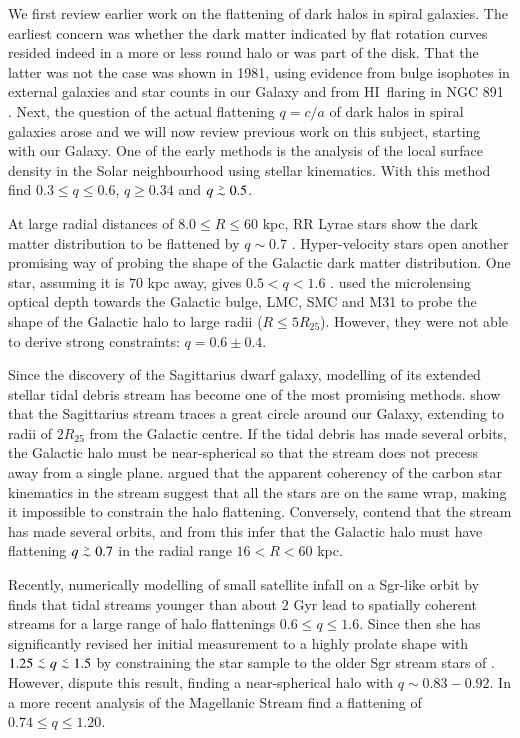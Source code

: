 \documentclass[traditabstract]{aa} %
\newcommand\lesim{\lower.5ex\hbox{$\; \buildrel < \over \sim \;$}}
\newcommand\gesim{\lower.5ex\hbox{$\; \buildrel > \over \sim \;$}}
\newcommand\HI{H{\small I}}
\begin{document}
We first review earlier work on the flattening of dark
halos in spiral galaxies. The earliest concern was whether 
the dark matter indicated by flat rotation curves resided indeed in 
a more or less round halo or was part of the disk. 
That the latter was not the case was
shown in 1981, using evidence from bulge isophotes in external
galaxies and star counts in our Galaxy \citep{mrs81} and from \HI\ flaring
in NGC 891 \citep{vdkruit1981}. Next, the question of the actual
flattening $q = c/a$ of dark
halos in spiral galaxies arose and we will now review previous work on this
subject, starting with our Galaxy.  One of the
early methods is the analysis of the local surface density in the
Solar neighbourhood using stellar kinematics. 
With this method \citet{bmo1987} find $0.3 \leq q \leq
0.6$, \citet{vdmarel1991} $q \geq 0.34$ and  \citet{bsmks2005} $q
\gesim 0.5$.


At large radial distances of $8.0 \leq R \leq 60$ kpc, RR Lyrae stars
show the dark matter distribution to be flattened by $q \sim 0.7$
\citep{ac1994}. Hyper-velocity stars open another promising way of
probing the shape of the Galactic dark matter distribution. One star,
assuming it is $70$ kpc away, gives $0.5 < q < 1.6$  \citep{ggmez2005}. 
\citet{scmz1999} used the microlensing optical depth towards the
Galactic bulge, LMC, SMC and M31 to probe the shape of the Galactic halo to
large radii ($R\leq 5 R_{25}$). However, they were not able to derive 
strong constraints: $q =0.6 \pm 0.4$.

Since the discovery of the Sagittarius dwarf galaxy, modelling of its
extended stellar tidal debris stream has become one of the most
promising methods. \citet{mswo2003} show that the Sagittarius stream traces a
great circle around our Galaxy, extending to radii of $2 R_{25}$ from
the Galactic centre. If the tidal debris has made several orbits, the
Galactic halo must be near-spherical so that the stream does not precess away
from a single plane. \citet{merrifield2004}
argued that the apparent coherency of the carbon star kinematics in
the stream suggest that all the stars are on the same wrap, making it
impossible to constrain the halo flattening. Conversely,
\citet{ilitq2001} contend that the stream has made several orbits, and from
this infer that the Galactic halo must have flattening $q \gesim 0.7$
in the radial range $16 < R < 60$ kpc.

Recently, numerically modelling of small satellite infall on a
Sgr-like orbit by \citet{helmi2004b} finds that tidal streams younger
than about $2$ Gyr lead to spatially coherent streams for a large
range of halo flattenings $0.6 \leq q \leq 1.6$. Since then she
\citep{helmi2004c} has significantly revised her initial measurement
to a highly prolate shape with $1.25 \lesim q \lesim 1.5$ by
constraining the star sample to the older Sgr stream stars of
\citet{lmsj2004}. However, \citet{jlm2005} dispute this result,
finding a near-spherical halo with $q \sim 0.83-0.92$.  In a more
recent analysis of the Magellanic Stream \citet{rpt2007} find a
flattening of $0.74\le q \le 1.20$.
\end{document}
